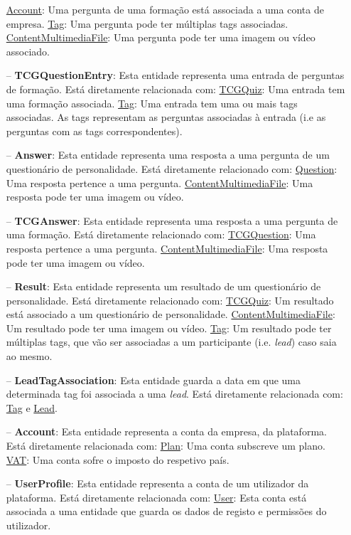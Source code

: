 \begin{itemize}
	\subitem \underline{Account}: Uma pergunta de uma formação está associada a uma conta de empresa.
	\subitem \underline{Tag}: Uma pergunta pode ter múltiplas tags associadas.
	\subitem \underline{ContentMultimediaFile}: Uma pergunta pode ter uma imagem ou vídeo associado.
	\item[--] \textbf{TCGQuestionEntry}: Esta entidade representa uma entrada de perguntas de formação. Está diretamente relacionada com:
	\subitem \underline{TCGQuiz}: Uma entrada tem uma formação associada.
	\subitem \underline{Tag}: Uma entrada tem uma ou mais tags associadas. As tags representam as perguntas associadas à entrada (i.e as perguntas com as tags correspondentes).
	\item[--] \textbf{Answer}: Esta entidade representa uma resposta a uma pergunta de um questionário de personalidade. Está diretamente relacionado com:
	\subitem \underline{Question}: Uma resposta pertence a uma pergunta.
	\subitem \underline{ContentMultimediaFile}: Uma resposta pode ter uma imagem ou vídeo.
	\item[--] \textbf{TCGAnswer}: Esta entidade representa uma resposta a uma pergunta de uma formação. Está diretamente relacionado com:
	\subitem \underline{TCGQuestion}: Uma resposta pertence a uma pergunta.
	\subitem \underline{ContentMultimediaFile}: Uma resposta pode ter uma imagem ou vídeo.
	\item[--] \textbf{Result}: Esta entidade representa um resultado de um questionário de personalidade. Está diretamente relacionado com:
	\subitem \underline{TCGQuiz}: Um resultado está associado a um questionário de personalidade.
	\subitem \underline{ContentMultimediaFile}: Um resultado pode ter uma imagem ou vídeo.
	\subitem \underline{Tag}: Um resultado pode ter múltiplas tags, que vão ser associadas a um participante (i.e. \textit{lead}) caso saia ao mesmo.
	\item[--] \textbf{LeadTagAssociation}: Esta entidade guarda a data em que uma determinada tag foi associada a uma \textit{lead}. Está diretamente relacionada com: \underline{Tag} e \underline{Lead}.
	\item[--] \textbf{Account}: Esta entidade representa a conta da empresa, da plataforma. Está diretamente relacionada com:
	\subitem \underline{Plan}: Uma conta subscreve um plano.
	\subitem \underline{VAT}: Uma conta sofre o imposto do respetivo país.
	\item[--] \textbf{UserProfile}: Esta entidade representa a conta de um utilizador da plataforma. Está diretamente relacionada com:
	\subitem \underline{User}: Esta conta está associada a uma entidade que guarda os dados de registo e permissões do utilizador.

\end{itemize}
